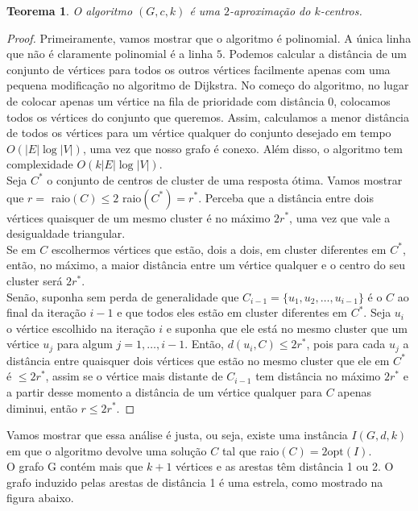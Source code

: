 \documentclass[12pt]{article}
\newcommand{\opt}{\ensuremath{\mathrm{opt}}}
\newtheorem{theorem}{Teorema}[section]
\begin{document}
    \begin{theorem}
        O algoritmo $(G,c,k)$ é uma $2$-aproximação do $k$-centros.
    \end{theorem}
    \begin{proof}
        Primeiramente, vamos mostrar que o algoritmo é polinomial. A única linha que não é claramente polinomial é a linha $5$. Podemos calcular a distância de um conjunto de vértices para todos os outros vértices facilmente apenas com uma pequena modificação no algoritmo de Dijkstra. No começo do algoritmo, no lugar de colocar apenas um vértice na fila de prioridade com distância 0, colocamos todos os vértices do conjunto que queremos. Assim, calculamos a menor distância de todos os vértices para um vértice qualquer do conjunto desejado em tempo $O(|E|\log|V|)$, uma vez que nosso grafo é conexo. Além disso, o algoritmo tem complexidade $O(k|E|\log|V| )$.\\
        Seja $C^*$ o conjunto de centros de cluster de uma resposta ótima. Vamos mostrar que $r=$ raio$(C) \leq 2$ raio$(C^*)=r^*$. Perceba que a distância entre dois vértices quaisquer de um mesmo cluster é no máximo $2r^*$, uma vez que vale a desigualdade triangular.\\ 
        Se em $C$ escolhermos vértices que estão, dois a dois, em cluster diferentes em $C^*$, então, no máximo, a maior distância entre um vértice qualquer e o centro do seu cluster será $2r^*$. \\
        Senão, suponha sem perda de generalidade que $C_{i-1} = \{ u_1,u_2,\ldots,u_{i-1}\}$ é o $C$ ao final da iteração $i-1$ e que todos eles estão em cluster diferentes em $C^*$. Seja $u_i$ o vértice escolhido na iteração $i$ e suponha que ele está no mesmo cluster que um vértice $u_j$ para algum $j=1,\ldots,i-1$. Então, $d(u_i,C) \leq 2r^*$, pois para cada $u_j$ a distância entre quaisquer dois vértices que estão no mesmo cluster que ele em $C^*$ é $\leq 2r^*$, assim se o vértice mais distante de $C_{i-1}$ tem distância no máximo $2r^*$ e a partir desse momento a distância de um vértice qualquer para $C$ apenas diminui, então $r\leq 2r^*$.
    \end{proof}
    Vamos mostrar que essa análise é justa, ou seja, existe uma instância $I(G,d,k)$ em que o algoritmo devolve uma solução $C$ tal que raio$(C) = 2 \opt(I)$. \\
    O grafo G contém mais que $k+1$ vértices e as arestas têm distância 1 ou 2. O grafo induzido pelas arestas de distância 1 é uma estrela, como mostrado na figura abaixo.
\end{document}
